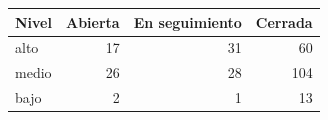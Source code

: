 \begin{tabular}{lrrr}
\toprule
Nivel & Abierta & En seguimiento & Cerrada \\
\midrule
alto & 17 & 31 & 60 \\
medio & 26 & 28 & 104 \\
bajo & 2 & 1 & 13 \\
\bottomrule
\end{tabular}
